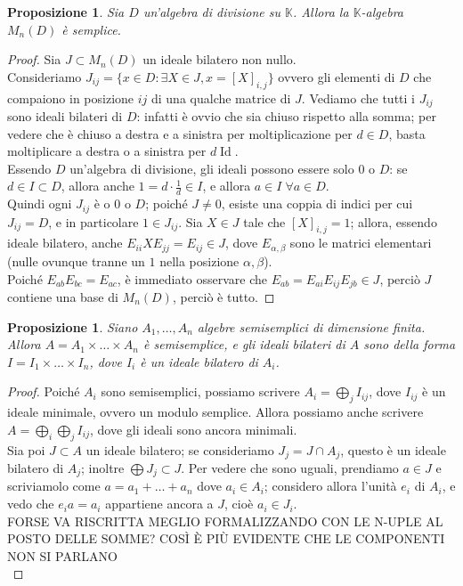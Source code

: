 \documentclass[11pt]{article}
\theoremstyle{plain}
\newtheorem{prop}[thm]{Proposizione}
\theoremstyle{definition}
\theoremstyle{remark}
\newcommand{\K}{\mathbb{K}}
\DeclareMathOperator{\Id}{Id}
\begin{document}
\begin{prop}
 Sia $D$ un'algebra di divisione su $\K$. Allora la $\K$-algebra $M_n(D)$ è semplice.
\end{prop}
\begin{proof}
 Sia $J\subset M_n(D)$ un ideale bilatero non nullo.\\
 Consideriamo $J_{ij}=\{x\in D:\exists X\in J, x=[X]_{i,j}\}$ ovvero gli elementi di $D$ che compaiono in posizione $ij$ di una qualche matrice di $J$.
 Vediamo che tutti i $J_{ij}$ sono ideali bilateri di $D$: infatti è ovvio che sia chiuso rispetto alla somma; per vedere che è chiuso a destra e a sinistra per moltiplicazione per $d\in D$, basta moltiplicare a destra o a sinistra per $d\Id$.\\
 Essendo $D$ un'algebra di divisione, gli ideali possono essere solo $0$ o $D$: se $d\in I\subset D$, allora anche $1=d\cdot\frac1 d\in I$, e allora $a\in I\;\forall a\in D$.\\
 Quindi ogni $J_{ij}$ è o $0$ o $D$; poiché $J\neq 0$, esiste una coppia di indici per cui $J_{ij}=D$, e in particolare $1\in J_{ij}$.
 Sia $X\in J$ tale che $[X]_{i,j}=1$; allora, essendo ideale bilatero, anche $E_{ii}XE_{jj}=E_{ij}\in J$, dove $E_{\alpha,\beta}$ sono le matrici elementari (nulle ovunque tranne un $1$ nella posizione $\alpha,\beta$).\\
 Poiché $E_{ab}E_{bc}=E_{ac}$, è immediato osservare che $E_{ab}=E_{ai}E_{ij}E_{jb}\in J$, perciò $J$ contiene una base di $M_n(D)$, perciò è tutto.
\end{proof}

\begin{prop}
 Siano $A_1,\dots,A_n$ algebre semisemplici di dimensione finita. Allora $A=A_1\times\dots\times A_n$ è semisemplice, e gli ideali bilateri di $A$ sono della forma $I=I_1\times\dots\times I_n$, dove $I_i$ è un ideale bilatero di $A_i$.
\end{prop}
\begin{proof}
 Poiché $A_i$ sono semisemplici, possiamo scrivere $A_i=\bigoplus_j I_{ij}$, dove $I_{ij}$ è un ideale minimale, ovvero un modulo semplice.
 Allora possiamo anche scrivere $A=\bigoplus_i\bigoplus_j I_{ij}$, dove gli ideali sono ancora minimali.\\
 Sia poi $J\subset A$ un ideale bilatero; se consideriamo $J_j=J\cap A_j$, questo è un ideale bilatero di $A_j$; inoltre $\bigoplus J_j\subset J$.
 Per vedere che sono uguali, prendiamo $a\in J$ e scriviamolo come $a=a_1+\dots+a_n$ dove $a_i\in A_i$; considero allora l'unità $e_i$ di $A_i$, e vedo che $e_ia=a_i$ appartiene ancora a $J$, cioè $a_i\in J_i$.\\
 FORSE VA RISCRITTA MEGLIO FORMALIZZANDO CON LE N-UPLE AL POSTO DELLE SOMME? COSÌ È PIÙ EVIDENTE CHE LE COMPONENTI NON SI PARLANO\\

\end{proof}
\end{document}

